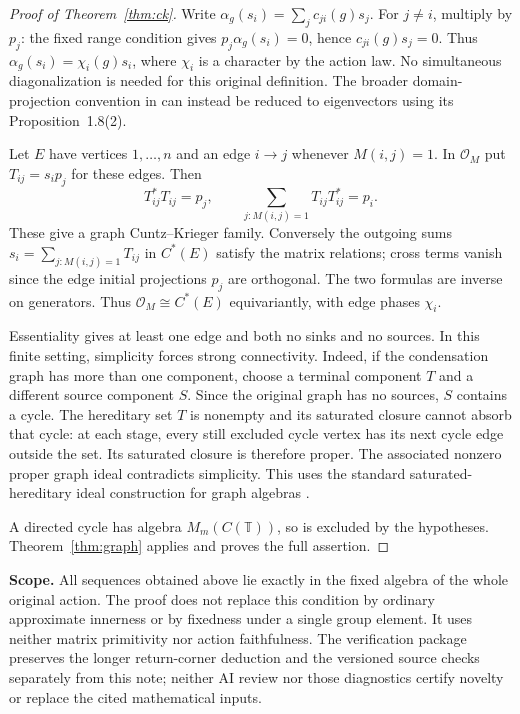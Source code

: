 \documentclass[11pt,a4paper]{article}
\theoremstyle{definition}
\newcommand{\T}{\mathbb T}
\begin{document}
\begin{proof}[Proof of Theorem~\ref{thm:ck}]
Write $\alpha_g(s_i)=\sum_j c_{ji}(g)s_j$. For $j\ne i$, multiply by
$p_j$: the fixed range condition gives
$p_j\alpha_g(s_i)=0$, hence $c_{ji}(g)s_j=0$. Thus
$\alpha_g(s_i)=\chi_i(g)s_i$, where $\chi_i$ is a character by the action
law. No simultaneous diagonalization is needed for this original
definition. The broader domain-projection convention in \cite{BS} can
instead be reduced to eigenvectors using its Proposition~1.8(2).

Let $E$ have vertices $1,\ldots,n$ and an edge $i\to j$ whenever
$M(i,j)=1$. In $\mathcal O_M$ put $T_{ij}=s_ip_j$ for these edges.
Then
\[
 T_{ij}^*T_{ij}=p_j,\qquad
 \sum_{j:M(i,j)=1}T_{ij}T_{ij}^*=p_i.
\]
These give a graph Cuntz--Krieger family. Conversely the outgoing sums
$s_i=\sum_{j:M(i,j)=1}T_{ij}$ in $C^*(E)$ satisfy the matrix relations;
cross terms vanish since the edge initial projections $p_j$ are
orthogonal. The two formulas are inverse on generators. Thus
$\mathcal O_M\cong C^*(E)$ equivariantly, with edge phases $\chi_i$.

Essentiality gives at least one edge and both no sinks and no sources. In this finite setting,
simplicity forces strong connectivity. Indeed, if the condensation graph
has more than one component, choose a terminal component $T$ and a
different source component $S$. Since the original graph has no sources,
$S$ contains a cycle. The hereditary set $T$ is nonempty and its saturated
closure cannot absorb that cycle: at each stage, every still excluded
cycle vertex has its next cycle edge outside the set. Its saturated
closure is therefore proper. The associated nonzero proper graph ideal
contradicts simplicity. This uses the standard saturated-hereditary ideal
construction for graph algebras \cite{KPR}.

A directed cycle has algebra $M_m(C(\T))$, so is excluded by the
hypotheses. Theorem~\ref{thm:graph} applies and proves the full assertion.
\end{proof}

\noindent\textbf{Scope.}
All sequences obtained above lie exactly in the fixed algebra of the
whole original action. The proof does not replace this condition by
ordinary approximate innerness or by fixedness under a single group
element. It uses neither matrix primitivity nor action faithfulness.
The verification package preserves the longer return-corner deduction
and the versioned source checks separately from this note; neither
AI review nor those diagnostics certify novelty or replace the cited
mathematical inputs.
\end{document}
